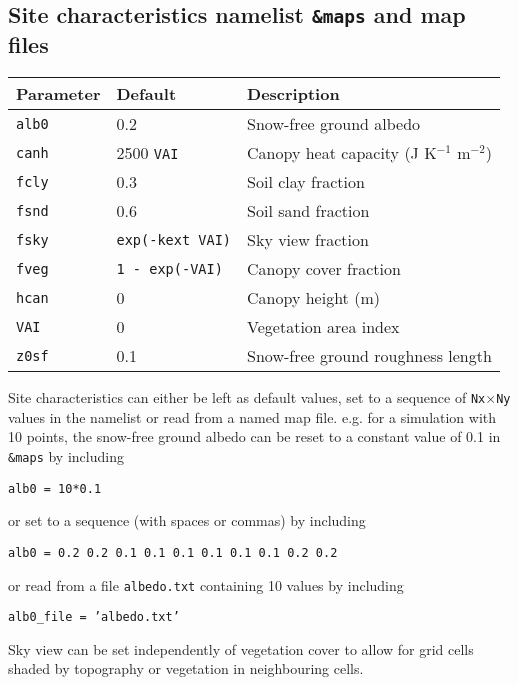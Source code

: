 \documentclass{article}
\begin{document}
\subsection*{Site characteristics namelist {\tt \&maps} and map files}

\begin{tabular}{|l|l|l|}
\hline
Parameter   & Default              & Description                                \\
\hline
{\tt alb0}  & 0.2                  & Snow-free ground albedo                    \\
{\tt canh}  & 2500 {\tt VAI}       & Canopy heat capacity (J K$^{-1}$ m$^{-2}$) \\
{\tt fcly}  & 0.3                  & Soil clay fraction                         \\
{\tt fsnd}  & 0.6                  & Soil sand fraction                         \\
{\tt fsky}  & {\tt exp(-kext VAI)} & Sky view fraction                          \\
{\tt fveg}  & {\tt 1 - exp(-VAI)}  & Canopy cover fraction                      \\
{\tt hcan}  & 0                    & Canopy height (m)                          \\
{\tt VAI}   & 0                    & Vegetation area index                      \\
{\tt z0sf}  & 0.1                  & Snow-free ground roughness length          \\
\hline 
\end{tabular}

Site characteristics can either be left as default values, set to a sequence of {\tt Nx$\times$Ny} values in the namelist or read from a named map file. e.g. for a simulation with 10 points, the snow-free ground albedo can be reset to a constant value of 0.1 in {\tt \&maps} by including

{\tt alb0 = 10*0.1}

or set to a sequence (with spaces or commas) by including

{\tt alb0 = 0.2 0.2 0.1 0.1 0.1 0.1 0.1 0.1 0.2 0.2} 

or read from a file {\tt albedo.txt} containing 10 values by including

{\tt alb0\_file = 'albedo.txt'}

Sky view can be set independently of vegetation cover to allow for grid cells shaded by topography or vegetation in neighbouring cells.
\end{document}
